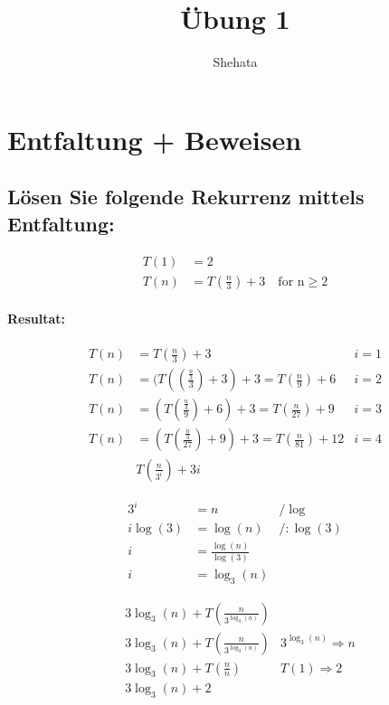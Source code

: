 \documentclass[12pt,letterpaper]{article}
\title{\"Ubung 1}
\author{Shehata}
\date{}
\begin{document}
\maketitle
\section{Entfaltung + Beweisen}

\subsection{Lösen Sie folgende Rekurrenz mittels Entfaltung:}

\begin{align*}
    T(1) & = 2                                            \\
    T(n) & = T(\frac{n}{3}) + 3 \quad \text{for n}\geq  2
\end{align*}

\paragraph{Resultat:}
\begin{align*}
    T(n) & = T(\frac{n}{3}) + 3                                         & i = 1 \\
    T(n) & = (T((\frac{\frac{n}{3}}{3}) + 3) + 3 = T(\frac{n}{9}) + 6   & i = 2 \\
    T(n) & = (T(\frac{\frac{n}{3}}{9}) + 6) + 3 = T(\frac{n}{27}) + 9   & i = 3 \\
    T(n) & = (T(\frac{\frac{n}{3}}{27}) + 9) + 3 = T(\frac{n}{81}) + 12 & i = 4 \\
         & T(\frac{n}{3^{i}}) + 3i
\end{align*}

\begin{align*}
    3^{i}    & = n                       & / \log     \\
    i\log(3) & = \log(n)                 & / :\log(3) \\
    i        & = \frac{\log(n)}{\log(3)} &            \\
    i        & = \log_3(n)               &
\end{align*}

\begin{align*}
     & 3\log_3(n) + T(\frac{n}{3^{\log_3(n)}})                                \\
     & 3\log_3(n) + T(\frac{n}{3^{\log_3(n)}}) & 3^{\log_3(n)} \Rightarrow  n \\
     & 3\log_3(n) + T(\frac{n}{n})             & T(1) \Rightarrow  2          \\
     & 3\log_3(n) + 2
\end{align*}
\end{document}
